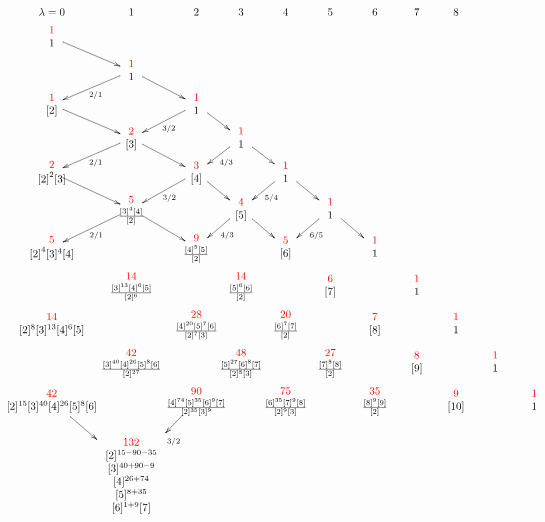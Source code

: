 \documentclass{article}
\theoremstyle{definition}
\numberwithin{equation}{subsection}
\begin{document}
\begin{figure}
  
%
\newcommand{\sqrr}{\square\ar[r]}
%
%
\[ { } \hspace{-.253in}
%
\xymatrix @C=15pt @R=1pt {
  {\lambda=0  }       &  1             &  2      &  3  &  4  &  5   & 6 & 7 & 8 
  \\  %
    {\du{1}{1} }\ar[dr]
    \\
& {\du{1}{1}}\ar[dr]\ar[dl]^{2/1}
\\ 
{\du{1}{{[2]}} }\ar[dr]    &                  &
{\du{1}{1}}\ar[dr]\ar[dl]^{3/2}
\\
&{\du{2}{[3]}} \ar[dr]\ar[dl]^{2/1}               &     &
{\du{1}{1}}\ar[dr]\ar[dl]^{4/3}
\\ 
{ \du{2}{{[ 2]}^2 [3]}}  \ar[dr]  &                     &
{\du{3}{[4]} }  \ar[dr]\ar[dl]^{3/2}  &    &
{\du{1}{1} } \ar[dr]\ar[dl]^{5/4}
\\
    & {\du{5}{{\frac{ [3]^4 [4]}{[2]}^{}}}}  \ar[dr]\ar[dl]^{2/1}   &  &
    {\du{4}{[5]}} \ar[dr]\ar[dl]^{4/3} &  &
    {\du{1}{1}} \ar[dr]\ar[dl]^{6/5}
    \\ 
    {\du{5}{{[2]}^4 [3]^4 [4]}} &              &
    {\du{9}{{\frac{[4]^5[5]}{[2]}^{}}}} &    &
    {\du{5}{[6]}} & &{ \du{1}{1} }
    \\ 
    &{\du{14}{\frac{[3]^{13}[4]^6[5]}{[2]^{6}}}} &&
    {\du{14}{\frac{[5]^6[6]}{[2]^{}}}} &&
    {\du{6}{[7]}} &&
    {\du{1}{1}}
 \\
   {\du{14}{[2]^8[3]^{13}[4]^6[5]}}  &&
   {\du{28}{\frac{[4]^{20}[5]^7[6]}{[2]^{7}[3]^{}}}} &&
   {\du{20}{\frac{[6]^7[7]}{[2]^{}}}} &&
   {\du{7}{[8]}}  &&
   {\du{1}{1}} \\
   & {\du{42}{\frac{[3]^{40}[4]^{26}[5]^8[6]}{[2]^{27}}}} &&
   {\du{48}{\frac{[5]^{27}[6]^8[7]}{[2]^{8}[3]^{}}}} &&
   {\du{27}{\frac{[7]^8[8]}{[2]^{}}}} &&
   {\du{8}{[9]}} &&
   {\du{1}{1}}
 \\
   {\du{42}{[2]^{15}[3]^{40}[4]^{26}[5]^{8}[6]}}\ar[dr] &&
   {\du{90}{\frac{[4]^{74}[5]^{35}[6]^{9}[7]}{[2]^{35}[3]^{9}}}}\ar[dl]^{3/2} &&
   {\du{75}{
       \frac{  [6]^{35}[7]^{9}[8]}{[2]^{9}[3]^{}}}} &&
   {\du{35}{\frac{[8]^9[9]}{[2]^{}}}} &&
   {\du{9}{[10]}} &&
   {\du{1}{1}}
   \\
   & { \begin{array}{c} { } \\ \textcolor{red}{132} \\ 
        {[2]^{15-90-35}} \\ {[3]^{40+90-9}} \\
        {[4]^{26+74}} \\ {[5]^{8+35}} \\ {[6]^{1+9}[7]}
        \end{array} }
}
\]



\end{figure}
\end{document}
